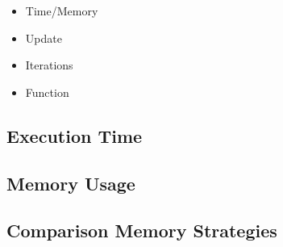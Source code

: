 \begin{itemize}
  \item Time/Memory
  \item Update
  \item Iterations
  \item Function
\end{itemize}

\subsection{Execution Time}


\subsection{Memory Usage}


\subsection{Comparison Memory Strategies}